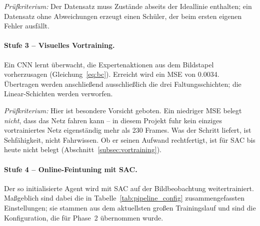 \emph{Prüfkriterium:} Der Datensatz muss Zustände abseits der Ideallinie enthalten; ein Datensatz ohne Abweichungen erzeugt einen Schüler, der beim ersten eigenen Fehler ausfällt.

\paragraph{Stufe 3 -- Visuelles Vortraining.}
Ein \ac{CNN} lernt überwacht, die Expertenaktionen aus dem Bildstapel vorherzusagen (Gleichung~\eqref{eq:bc}). Erreicht wird ein \acs{MSE} von \num{0.0034}. Übertragen werden anschließend ausschließlich die drei Faltungsschichten; die Linear-Schichten werden verworfen.

\emph{Prüfkriterium:} Hier ist besondere Vorsicht geboten. Ein niedriger \acs{MSE} belegt \emph{nicht}, dass das Netz fahren kann -- in diesem Projekt fuhr kein einziges vortrainiertes Netz eigenständig mehr als \num{230} Frames. Was der Schritt liefert, ist Sehfähigkeit, nicht Fahrwissen. Ob er seinen Aufwand rechtfertigt, ist für \ac{SAC} bis heute nicht belegt (Abschnitt~\ref{subsec:vortraining}).

\paragraph{Stufe 4 -- Online-Feintuning mit SAC.}
Der so initialisierte Agent wird mit \ac{SAC} auf der Bildbeobachtung weitertrainiert. Maßgeblich sind dabei die in Tabelle~\ref{tab:pipeline_config} zusammengefassten Einstellungen; sie stammen aus dem aktuellsten großen Trainingslauf und sind die Konfiguration, die für Phase~2 übernommen wurde.

